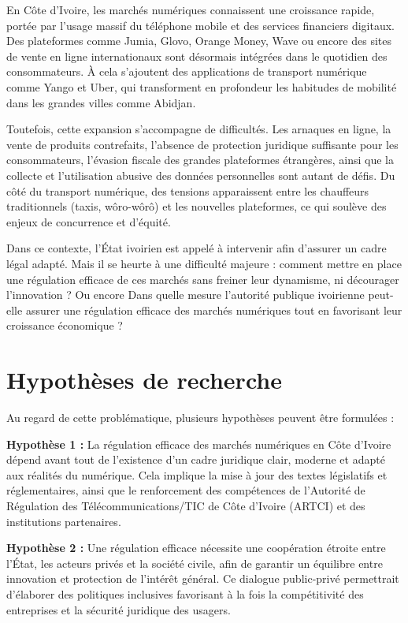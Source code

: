 En Côte d’Ivoire, les marchés numériques connaissent une croissance rapide, portée par l’usage massif du téléphone mobile et des services financiers digitaux. Des plateformes comme Jumia, Glovo, Orange Money, Wave ou encore des sites de vente en ligne internationaux sont désormais intégrées dans le quotidien des consommateurs. À cela s’ajoutent des applications de transport numérique comme Yango et Uber, qui transforment en profondeur les habitudes de mobilité dans les grandes villes comme Abidjan.

Toutefois, cette expansion s’accompagne de difficultés. Les arnaques en ligne, la vente de produits contrefaits, l’absence de protection juridique suffisante pour les consommateurs, l’évasion fiscale des grandes plateformes étrangères, ainsi que la collecte et l’utilisation abusive des données personnelles sont autant de défis. Du côté du transport numérique, des tensions apparaissent entre les chauffeurs traditionnels (taxis, wôro-wôrô) et les nouvelles plateformes, ce qui soulève des enjeux de concurrence et d’équité.

Dans ce contexte, l’État ivoirien est appelé à intervenir afin d’assurer un cadre légal adapté. Mais il se heurte à une difficulté majeure : comment mettre en place une régulation efficace de ces marchés sans freiner leur dynamisme, ni décourager l’innovation ? Ou encore 
Dans quelle mesure l’autorité publique ivoirienne peut-elle assurer une régulation efficace des marchés numériques tout en favorisant leur croissance économique ?

\section*{Hypothèses de recherche}

Au regard de cette problématique, plusieurs hypothèses peuvent être formulées :

\textbf{Hypothèse 1 :}
La régulation efficace des marchés numériques en Côte d’Ivoire dépend avant tout de l’existence d’un cadre juridique clair, moderne et adapté aux réalités du numérique.
Cela implique la mise à jour des textes législatifs et réglementaires, ainsi que le renforcement des compétences de l’Autorité de Régulation des Télécommunications/TIC de Côte d’Ivoire (ARTCI) et des institutions partenaires.

\textbf{Hypothèse 2 :}
Une régulation efficace nécessite une coopération étroite entre l’État, les acteurs privés et la société civile, afin de garantir un équilibre entre innovation et protection de l’intérêt général.
Ce dialogue public-privé permettrait d’élaborer des politiques inclusives favorisant à la fois la compétitivité des entreprises et la sécurité juridique des usagers.

